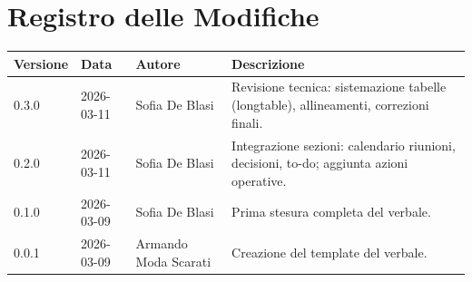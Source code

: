 \section*{Registro delle Modifiche}
\begin{table}[ht]
    \centering
    \renewcommand{\arraystretch}{1.5}
    \begin{tabularx}{\textwidth}{l l l X}
        \toprule
        \textbf{Versione} & \textbf{Data} & \textbf{Autore} & \textbf{Descrizione} \\
        \midrule
        0.3.0 & 2026-03-11 & Sofia De Blasi & Revisione tecnica: sistemazione tabelle (longtable), allineamenti, correzioni finali. \\
        0.2.0 & 2026-03-11 & Sofia De Blasi & Integrazione sezioni: calendario riunioni, decisioni, to-do; aggiunta azioni operative. \\
        0.1.0 & 2026-03-09 & Sofia De Blasi & Prima stesura completa del verbale. \\
        0.0.1 & 2026-03-09 & Armando Moda Scarati & Creazione del template del verbale. \\
        \bottomrule
    \end{tabularx}
\end{table}
